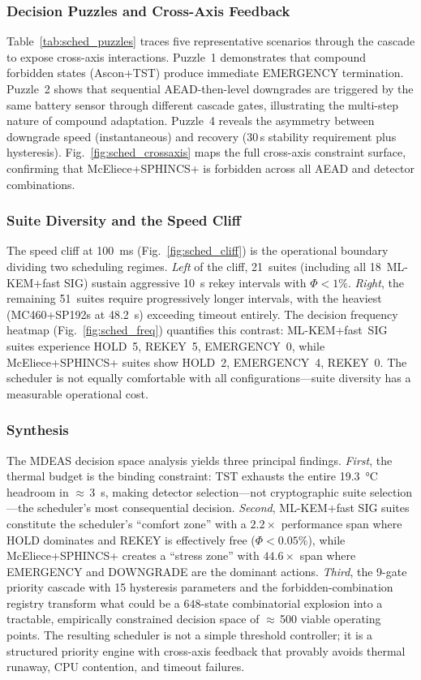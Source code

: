 \subsubsection{Decision Puzzles and Cross-Axis Feedback}
Table~\ref{tab:sched_puzzles} traces five representative scenarios
through the cascade to expose cross-axis interactions.
Puzzle~1 demonstrates that compound forbidden states (Ascon+TST)
produce immediate EMERGENCY termination.
Puzzle~2 shows that sequential AEAD-then-level downgrades are triggered
by the same battery sensor through different cascade gates, illustrating
the multi-step nature of compound adaptation.
Puzzle~4 reveals the asymmetry between downgrade speed (instantaneous)
and recovery (30\,s stability requirement plus hysteresis).
Fig.~\ref{fig:sched_crossaxis} maps the full cross-axis constraint
surface, confirming that McEliece+SPHINCS+ is forbidden across all
AEAD and detector combinations.

\subsubsection{Suite Diversity and the Speed Cliff}
The speed cliff at \SI{100}{\ms} (Fig.~\ref{fig:sched_cliff}) is the
operational boundary dividing two scheduling regimes.  \emph{Left} of
the cliff, 21~suites (including all 18~ML-KEM+fast SIG) sustain
aggressive \SI{10}{\second} rekey intervals with $\Phi<1\%$.
\emph{Right}, the remaining 51~suites require progressively longer
intervals, with the heaviest (MC460+SP192s at \SI{48.2}{\second})
exceeding timeout entirely.  The decision frequency heatmap
(Fig.~\ref{fig:sched_freq}) quantifies this contrast:
ML-KEM+fast~SIG suites experience HOLD~5, REKEY~5, EMERGENCY~0,
while McEliece+SPHINCS+ suites show HOLD~2, EMERGENCY~4, REKEY~0.
The scheduler is not equally comfortable with all configurations---suite
diversity has a measurable operational cost.

\subsubsection{Synthesis}
The MDEAS decision space analysis yields three principal findings.
\emph{First}, the thermal budget is the binding constraint: TST
exhausts the entire \SI{19.3}{\degreeCelsius} headroom in
${\approx}\,$\SI{3}{\second}, making detector selection---not
cryptographic suite selection---the scheduler's most consequential
decision.
\emph{Second}, ML-KEM+fast SIG suites constitute the scheduler's
``comfort zone'' with a $2.2{\times}$ performance span where HOLD
dominates and REKEY is effectively free ($\Phi<0.05\%$), while
McEliece+SPHINCS+ creates a ``stress zone'' with $44.6{\times}$ span
where EMERGENCY and DOWNGRADE are the dominant actions.
\emph{Third}, the 9-gate priority cascade with 15 hysteresis parameters
and the forbidden-combination registry transform what could be a
$648$-state combinatorial explosion into a tractable, empirically
constrained decision space of ${\approx}\,$500 viable operating points.
The resulting scheduler is not a simple threshold controller; it is
a structured priority engine with cross-axis feedback that
provably avoids thermal runaway, CPU contention, and timeout failures.

